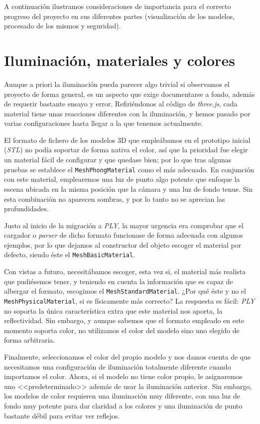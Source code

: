 
A continuación ilustramos consideraciones de importancia para el correcto progreso del proyecto en sus diferentes partes (visualización de los modelos, procesado de los mismos y seguridad).

\section{Iluminación, materiales y colores}
Aunque a priori la iluminación pueda parecer algo trivial si observamos el proyecto de forma general, es un aspecto que exige documentarse a fondo, además de requerir bastante ensayo y error. Refiriéndonos al código de \textit{three.js}, cada material tiene unas reacciones diferentes con la iluminación, y hemos pasado por varias configuraciones hasta llegar a la que tenemos actualmente.

El formato de fichero de los modelos 3D que empleábamos en el prototipo inicial (\textit{STL}) no podía soportar de forma nativa el color, así que la prioridad fue elegir un material fácil de configurar y que quedase bien; por lo que tras algunas pruebas se establece el \texttt{MeshPhongMaterial} como el más adecuado.
En conjunción con este material, emplearemos una luz de punto algo potente que enfoque la escena ubicada en la misma posición que la cámara y una luz de fondo tenue. Sin esta combinación no aparecen sombras, y por lo tanto no se aprecian las profundidades.

Justo al inicio de la migración a \textit{PLY}, la mayor urgencia era comprobar que el cargador o \textit{parser} de dicho formato funcionase de forma adecuada con algunos ejemplos, por lo que dejamos al constructor del objeto escoger el material por defecto, siendo éste el \texttt{MeshBasicMaterial}.

Con vistas a futuro, necesitábamos escoger, esta vez si, el material más realista que pudiésemos tener, y teniendo en cuenta la información que es capaz de albergar el formato, escogimos el \texttt{MeshStandardMaterial}. ¿Por qué éste y no el \texttt{MeshPhysicalMaterial}, si es físicamente más correcto?
La respuesta es fácil: \textit{PLY} no soporta la única característica extra que este material nos aporta, la reflectividad. Sin embargo, y aunque sabemos que el formato empleado en este momento soporta color, no utilizamos el color del modelo sino uno elegido de forma arbitraria.

Finalmente, seleccionamos el color del propio modelo y nos damos cuenta de que necesitamos una configuración de iluminación totalmente diferente cuando importamos el color. Ahora, si el modelo no tiene color propio, le asignaremos uno <<predeterminado>> además de usar la iluminación anterior.
Sin embargo, los modelos de color requieren una iluminación muy diferente, con una luz de fondo muy potente para dar claridad a los colores y una iluminación de punto bastante débil para evitar ver reflejos.

